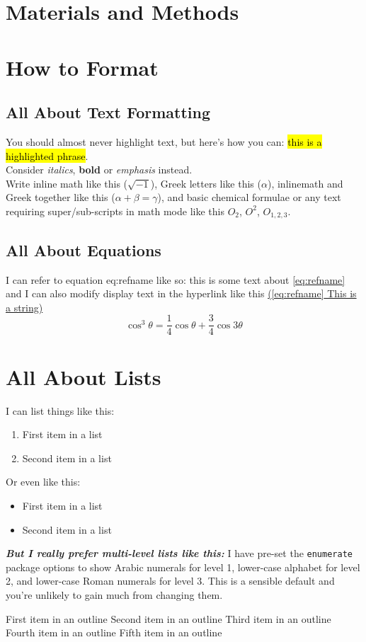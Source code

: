 \documentclass{getwriting}
\begin{document}
\section{Materials and Methods}
\section{How to Format}
\subsection{All About Text Formatting}
You should almost never highlight text, but here's how you can: \hl{this is a highlighted phrase}.\\
Consider \textit{italics}, \textbf{bold} or \emph{emphasis} instead.\\
Write inline math like this ($\sqrt{-1}$), Greek letters like this ($\alpha$), inlinemath and Greek together like this ($\alpha + \beta = \gamma$), and basic chemical formulae or any text requiring super/sub-scripts in math mode like this $O_2$, $O^2$, $O_{1,2,3}$. 
\subsection{All About Equations}
I can refer to equation eq:refname like so: this is some text about \hyperref[eq:refname]{\autoref{eq:refname}} and I can also modify display text in the hyperlink like this \hyperref[eq:refname]{(\autoref{eq:refname} This is a string)}
\begin{equation}
	\cos^3 \theta =\frac{1}{4}\cos\theta+\frac{3}{4}\cos 3\theta
	\label{eq:refname}
\end{equation}
\section{All About Lists}
I can list things like this:
\begin{enumerate}
	\item First item in a list
	\item Second item in a list
\end{enumerate}
Or even like this:
\begin{itemize}
	\item{First item in a list}
	\item{Second item in a list}
\end{itemize}
\textit{\textbf{But I really prefer \textbf{multi-level lists} like this:}}
I have pre-set the \lstinline{enumerate} package options to show Arabic numerals for level 1, lower-case alphabet for level 2, and lower-case Roman numerals for level 3. This is a sensible default and you're unlikely to gain much from changing them.
\begin{outline}[enumerate]
	\1 First item in an outline
	\2 Second item in an outline
	\3 Third item in an outline
	\1 Fourth item in an outline
	\2 Fifth item in an outline
\end{outline}
\end{document}
